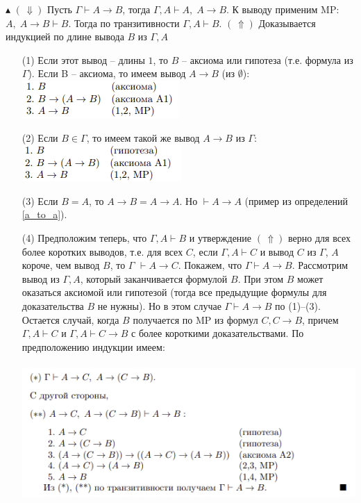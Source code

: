 $\blacktriangle$ $(\,\Downarrow)$ Пусть $\Gamma \vdash A\to B$, тогда $\Gamma, A \vdash A,\; A\to B$. К выводу применим MP: $A,\;A\to B \vdash B$. Тогда по транзитивности $\Gamma, A\vdash B$. \newline $(\,\Uparrow)$ Доказывается индукцией по длине вывода $B$ из $\Gamma, A$
\begin{itemize}
    \item[(1)] Если этот вывод -- длины $1$, то $B$ -- аксиома или гипотеза (т.е. формула из $\Gamma$). \newline Если B -- аксиома, то имеем вывод $A \to B$ (из $\emptyset$): \newline \includegraphics[width=0.35\linewidth]{images/1.1_case1.png}
    \item[(2)] Если $B \in \Gamma$, то имеем такой же вывод $A \to B$ из $\Gamma$: \newline \includegraphics[width=0.35\linewidth]{images/1.1_case2.png}
    \item[(3)] Если $B = A$, то $A \to B = A \to A$. Но $\vdash A \to A$ (пример из определений \ref{a_to_a}).
    \item[(4)] Предположим теперь, что $\Gamma, A \vdash B$ и утверждение $(\,\Uparrow)$ верно для всех более коротких выводов, т.е. для всех $C$, если $\Gamma, A \vdash C$ и вывод $C$ из $\Gamma$, $A$ короче, чем вывод $B$, то $\Gamma$ $\vdash A \to C$.
    \newline Покажем, что $\Gamma \vdash A \to B$. Рассмотрим вывод из $\Gamma, A$, который заканчивается формулой $B$. При этом $B$ может оказаться аксиомой или гипотезой (тогда все предыдущие формулы для доказательства $B$ не нужны). Но в этом случае  $\Gamma \vdash A \to B$ по (1)–(3).
    \newline Остается случай, когда $B$ получается по MP из формул $C, C \to B$, причем $\Gamma, A \vdash C$ и $\Gamma, A \vdash C \to B$ с более короткими доказательствами. По предположению индукции имеем:
    \\
    \\
    \includegraphics[width=0.8\linewidth]{images/1.1_case3.png}
\end{itemize}

